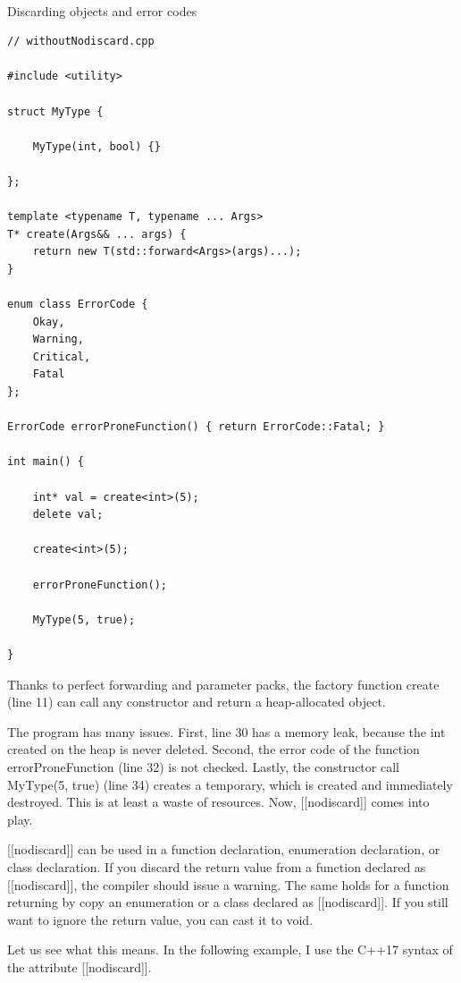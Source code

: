 \hspace*{\fill} \\ %
\noindent
Discarding objects and error codes
\begin{lstlisting}[style=styleCXX]
// withoutNodiscard.cpp

#include <utility>

struct MyType {

	MyType(int, bool) {}

};

template <typename T, typename ... Args>
T* create(Args&& ... args) {
	return new T(std::forward<Args>(args)...);
}

enum class ErrorCode {
	Okay,
	Warning,
	Critical,
	Fatal
};

ErrorCode errorProneFunction() { return ErrorCode::Fatal; }

int main() {

	int* val = create<int>(5);
	delete val;
	
	create<int>(5);
	
	errorProneFunction();
	
	MyType(5, true);

}
\end{lstlisting}

Thanks to perfect forwarding and parameter packs, the factory function create (line 11) can call any constructor and return a heap-allocated object.

The program has many issues. First, line 30 has a memory leak, because the int created on the heap is never deleted. Second, the error code of the function errorProneFunction (line 32) is not checked. Lastly, the constructor call MyType(5, true) (line 34) creates a temporary, which is created and immediately destroyed. This is at least a waste of resources. Now, [[nodiscard]] comes into play.

[[nodiscard]] can be used in a function declaration, enumeration declaration, or class declaration. If you discard the return value from a function declared as [[nodiscard]], the compiler should issue a warning. The same holds for a function returning by copy an enumeration or a class declared as [[nodiscard]]. If you still want to ignore the return value, you can cast it to void.

Let us see what this means. In the following example, I use the C++17 syntax of the attribute [[nodiscard]].

